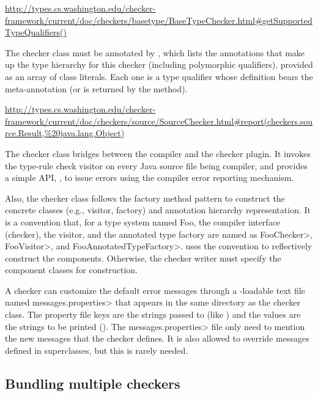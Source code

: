 \urldef{\getSupportedTypeQualifiersURL}\url{http://types.cs.washington.edu/checker-framework/current/doc/checkers/basetype/BaseTypeChecker.html#getSupportedTypeQualifiers()}

The checker class must be annotated by
, which lists the annotations
that make up the type hierarchy for this checker (including
polymorphic qualifiers), provided as an array of class literals.  Each
one is a type qualifier whose definition bears the
 meta-annotation (or is
returned by the
method).

\urldef{\reportURL}\url{http://types.cs.washington.edu/checker-framework/current/doc/checkers/source/SourceChecker.html#report(checkers.source.Result,%20java.lang.Object)}

The checker class bridges between the compiler and the checker plugin.  It
invokes the type-rule check visitor on every Java source file being
compiler, and provides a simple API, , to issue
errors using the compiler error reporting mechanism.

Also, the checker class follows the factory method pattern to
construct the concrete classes (e.g., visitor, factory) and annotation
hierarchy representation.  It is a convention that, for
a type system named Foo, the compiler
interface (checker), the visitor, and the annotated type factory are
named as \<FooChecker>, \<FooVisitor>, and \<FooAnnotatedTypeFactory>.
 uses the convention to
reflectively construct the components.  Otherwise, the checker writer
must specify the component classes for construction.

A checker can customize the default error messages through a
-loadable text file named
\<messages.properties> that appears in the same directory as the checker class.
The property file keys are the strings passed to 
(like ) and the values are the strings to be
printed ().
The \<messages.properties> file only need to mention the new messages that
the checker defines.
It is also allowed to override messages defined in superclasses, but this
is rarely needed.

\subsection{Bundling multiple checkers}

